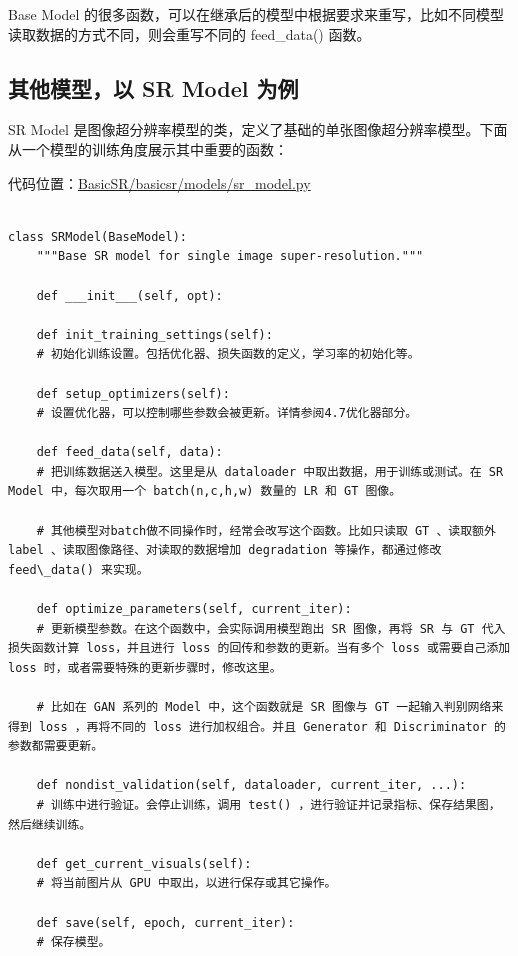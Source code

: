 \documentclass[../main.tex]{subfiles}
\begin{document}
\begin{hl} %
    Base Model 的很多函数，可以在继承后的模型中根据要求来重写，比如不同模型读取数据的方式不同，则会重写不同的 feed\_data() 函数。
\end{hl}

\subsection{其他模型，以 SR Model 为例}\label{Model:SR Model}

SR Model 是图像超分辨率模型的类，定义了基础的单张图像超分辨率模型。下面从一个模型的训练角度展示其中重要的函数：

代码位置：\href{https://github.com/XPixelGroup/BasicSR/blob/master/basicsr/models/sr_model.py}{BasicSR/basicsr/models/sr\_model.py}

\begin{verbatim}

class SRModel(BaseModel):
    """Base SR model for single image super-resolution."""

    def ___init___(self, opt):

    def init_training_settings(self):
    # 初始化训练设置。包括优化器、损失函数的定义，学习率的初始化等。

    def setup_optimizers(self):
    # 设置优化器，可以控制哪些参数会被更新。详情参阅4.7优化器部分。

    def feed_data(self, data):
    # 把训练数据送入模型。这里是从 dataloader 中取出数据，用于训练或测试。在 SR Model 中，每次取用一个 batch(n,c,h,w) 数量的 LR 和 GT 图像。

    # 其他模型对batch做不同操作时，经常会改写这个函数。比如只读取 GT 、读取额外 label 、读取图像路径、对读取的数据增加 degradation 等操作，都通过修改 feed\_data() 来实现。

    def optimize_parameters(self, current_iter):
    # 更新模型参数。在这个函数中，会实际调用模型跑出 SR 图像，再将 SR 与 GT 代入损失函数计算 loss，并且进行 loss 的回传和参数的更新。当有多个 loss 或需要自己添加 loss 时，或者需要特殊的更新步骤时，修改这里。

    # 比如在 GAN 系列的 Model 中，这个函数就是 SR 图像与 GT 一起输入判别网络来得到 loss ，再将不同的 loss 进行加权组合。并且 Generator 和 Discriminator 的参数都需要更新。

    def nondist_validation(self, dataloader, current_iter, ...):
    # 训练中进行验证。会停止训练，调用 test() ，进行验证并记录指标、保存结果图，然后继续训练。

    def get_current_visuals(self):
    # 将当前图片从 GPU 中取出，以进行保存或其它操作。

    def save(self, epoch, current_iter):
    # 保存模型。
\end{verbatim}
\end{document}
